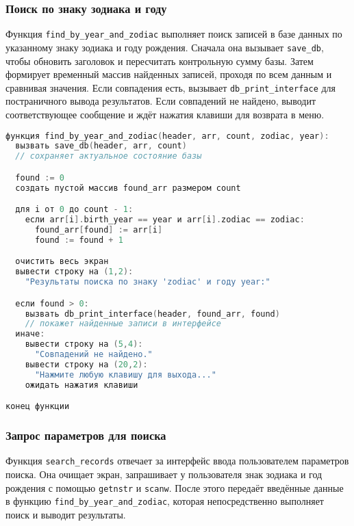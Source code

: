 \subsubsection*{Поиск по знаку зодиака и году}

Функция \texttt{find\_by\_year\_and\_zodiac} выполняет поиск записей в базе данных по указанному знаку зодиака и году рождения. Сначала она вызывает \texttt{save\_db}, чтобы обновить заголовок и пересчитать контрольную сумму базы. Затем формирует временный массив найденных записей, проходя по всем данным и сравнивая значения. Если совпадения есть, вызывает \texttt{db\_print\_interface} для постраничного вывода результатов. Если совпадений не найдено, выводит соответствующее сообщение и ждёт нажатия клавиши для возврата в меню.

\begin{lstlisting}[language=C, caption=Функция find\_by\_year\_and\_zodiac]
функция find_by_year_and_zodiac(header, arr, count, zodiac, year):
  вызвать save_db(header, arr, count)
  // сохраняет актуальное состояние базы

  found := 0
  создать пустой массив found_arr размером count

  для i от 0 до count - 1:
    если arr[i].birth_year == year и arr[i].zodiac == zodiac:
      found_arr[found] := arr[i]
      found := found + 1

  очистить весь экран
  вывести строку на (1,2):
    "Результаты поиска по знаку 'zodiac' и году year:"

  если found > 0:
    вызвать db_print_interface(header, found_arr, found)
    // покажет найденные записи в интерфейсе
  иначе:
    вывести строку на (5,4):
      "Совпадений не найдено."
    вывести строку на (20,2):
      "Нажмите любую клавишу для выхода..."
    ожидать нажатия клавиши

конец функции

\end{lstlisting}
\subsubsection*{Запрос параметров для поиска}

Функция \texttt{search\_records} отвечает за интерфейс ввода пользователем параметров поиска. Она очищает экран, запрашивает у пользователя знак зодиака и год рождения с помощью \texttt{getnstr} и \texttt{scanw}. После этого передаёт введённые данные в функцию \break\texttt{find\_by\_year\_and\_zodiac}, которая непосредственно выполняет поиск и выводит результаты.

